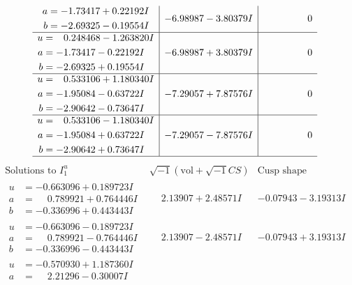 \documentclass[1p]{elsarticle_modified}
\theoremstyle{definition}
\newcommand{\I}{\sqrt{-1}}
\begin{document}
$$\begin{array}{c|c|c}
\begin{aligned}
a &= -1.73417 + 0.22192 I \\
b &= -2.69325 - 0.19554 I\end{aligned}
 & -6.98987 - 3.80379 I & \phantom{-0.000000 } 0 \\ \hline\begin{aligned}
u &= \phantom{-}0.248468 - 1.263820 I \\
a &= -1.73417 - 0.22192 I \\
b &= -2.69325 + 0.19554 I\end{aligned}
 & -6.98987 + 3.80379 I & \phantom{-0.000000 } 0 \\ \hline\begin{aligned}
u &= \phantom{-}0.533106 + 1.180340 I \\
a &= -1.95084 - 0.63722 I \\
b &= -2.90642 - 0.73647 I\end{aligned}
 & -7.29057 + 7.87576 I & \phantom{-0.000000 } 0 \\ \hline\begin{aligned}
u &= \phantom{-}0.533106 - 1.180340 I \\
a &= -1.95084 + 0.63722 I \\
b &= -2.90642 + 0.73647 I\end{aligned}
 & -7.29057 - 7.87576 I & \phantom{-0.000000 } 0\\
 \hline 
 \end{array}$$\newpage$$\begin{array}{c|c|c}  
\text{Solutions to }I^u_{1}& \I (\text{vol} + \sqrt{-1}CS) & \text{Cusp shape}\\
 \hline 
\begin{aligned}
u &= -0.663096 + 0.189723 I \\
a &= \phantom{-}0.789921 + 0.764446 I \\
b &= -0.336996 + 0.443443 I\end{aligned}
 & \phantom{-}2.13907 + 2.48571 I & -0.07943 - 3.19313 I \\ \hline\begin{aligned}
u &= -0.663096 - 0.189723 I \\
a &= \phantom{-}0.789921 - 0.764446 I \\
b &= -0.336996 - 0.443443 I\end{aligned}
 & \phantom{-}2.13907 - 2.48571 I & -0.07943 + 3.19313 I \\ \hline\begin{aligned}
u &= -0.570930 + 1.187360 I \\
a &= \phantom{-}2.21296 - 0.30007 I \\

\end{aligned}
\end{array}$$
\end{document}
